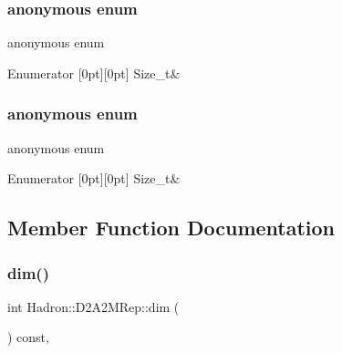 \subsubsection{\texorpdfstring{anonymous enum}{anonymous enum}}
{\footnotesize\ttfamily anonymous enum}

\begin{DoxyEnumFields}{Enumerator}
[0pt][0pt]{}\mbox{\label{structHadron_1_1D2A2MRep_abcc4e2e92ae3f5411465b6fa3c38ba50a9beb17643087ce6e48dd40696799fa65}} 
Size\+\_\+t&\\
\hline

\end{DoxyEnumFields}
\mbox{\label{structHadron_1_1D2A2MRep_abcc4e2e92ae3f5411465b6fa3c38ba50}} 
\subsubsection{\texorpdfstring{anonymous enum}{anonymous enum}}
{\footnotesize\ttfamily anonymous enum}

\begin{DoxyEnumFields}{Enumerator}
[0pt][0pt]{}\mbox{\label{structHadron_1_1D2A2MRep_abcc4e2e92ae3f5411465b6fa3c38ba50a9beb17643087ce6e48dd40696799fa65}} 
Size\+\_\+t&\\
\hline

\end{DoxyEnumFields}


\subsection{Member Function Documentation}
\mbox{\label{structHadron_1_1D2A2MRep_a8c1eee2c61a4d9f6721fe703253d5c26}} 
\subsubsection{\texorpdfstring{dim()}{dim()}\hspace{0.1cm}{\footnotesize\ttfamily [1/2]}}
{\footnotesize\ttfamily int Hadron\+::\+D2\+A2\+M\+Rep\+::dim (\begin{DoxyParamCaption}{ }\end{DoxyParamCaption}) const\hspace{0.3cm}{\ttfamily [inline]}, {\ttfamily [virtual]}}


